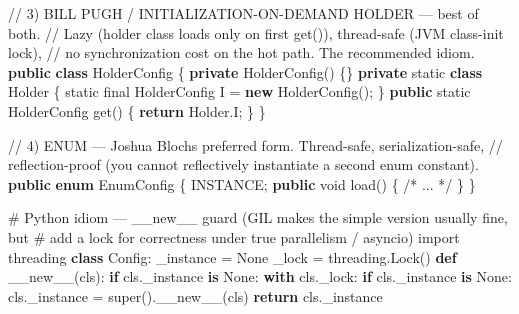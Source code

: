 \documentclass[11pt]{article}
\newenvironment{Shaded}{\begin{snugshade}}{\end{snugshade}}
\newcommand{\BuiltInTok}[1]{\textcolor[rgb]{0.50,0.55,0.55}{#1}}
\newcommand{\CommentTok}[1]{\textcolor[rgb]{0.48,0.49,0.49}{#1}}
\newcommand{\ControlFlowTok}[1]{\textcolor[rgb]{0.99,0.74,0.29}{\textbf{#1}}}
\newcommand{\DataTypeTok}[1]{\textcolor[rgb]{0.16,0.50,0.73}{#1}}
\newcommand{\FunctionTok}[1]{\textcolor[rgb]{0.56,0.27,0.68}{#1}}
\newcommand{\ImportTok}[1]{\textcolor[rgb]{0.15,0.68,0.38}{#1}}
\newcommand{\KeywordTok}[1]{\textcolor[rgb]{0.81,0.81,0.76}{\textbf{#1}}}
\newcommand{\NormalTok}[1]{\textcolor[rgb]{0.81,0.81,0.76}{#1}}
\newcommand{\OperatorTok}[1]{\textcolor[rgb]{0.81,0.81,0.76}{#1}}
\newcommand{\VariableTok}[1]{\textcolor[rgb]{0.15,0.68,0.68}{#1}}
\begin{document}
\begin{Shaded}
\begin{Highlighting}[]
\CommentTok{// 3) BILL PUGH / INITIALIZATION{-}ON{-}DEMAND HOLDER — best of both.}
\CommentTok{//    Lazy (holder class loads only on first get()), thread{-}safe (JVM class{-}init lock),}
\CommentTok{//    no synchronization cost on the hot path. The recommended idiom.}
\KeywordTok{public} \KeywordTok{class}\NormalTok{ HolderConfig }\OperatorTok{\{}
    \KeywordTok{private} \FunctionTok{HolderConfig}\OperatorTok{()} \OperatorTok{\{\}}
    \KeywordTok{private} \DataTypeTok{static} \KeywordTok{class} \BuiltInTok{Holder} \OperatorTok{\{} \DataTypeTok{static} \DataTypeTok{final}\NormalTok{ HolderConfig I }\OperatorTok{=} \KeywordTok{new} \FunctionTok{HolderConfig}\OperatorTok{();} \OperatorTok{\}}
    \KeywordTok{public} \DataTypeTok{static}\NormalTok{ HolderConfig }\FunctionTok{get}\OperatorTok{()} \OperatorTok{\{} \ControlFlowTok{return} \BuiltInTok{Holder}\OperatorTok{.}\FunctionTok{I}\OperatorTok{;} \OperatorTok{\}}
\OperatorTok{\}}

\CommentTok{// 4) ENUM — Joshua Bloch\textquotesingle{}s preferred form. Thread{-}safe, serialization{-}safe,}
\CommentTok{//    reflection{-}proof (you cannot reflectively instantiate a second enum constant).}
\KeywordTok{public} \KeywordTok{enum}\NormalTok{ EnumConfig }\OperatorTok{\{}
\NormalTok{    INSTANCE}\OperatorTok{;}
    \KeywordTok{public} \DataTypeTok{void} \FunctionTok{load}\OperatorTok{()} \OperatorTok{\{} \CommentTok{/* ... */} \OperatorTok{\}}
\OperatorTok{\}}
\end{Highlighting}
\end{Shaded}


\begin{Shaded}
\begin{Highlighting}[]
\CommentTok{\# Python idiom — \_\_new\_\_ guard (GIL makes the simple version usually fine, but}
\CommentTok{\# add a lock for correctness under true parallelism / asyncio)}
\ImportTok{import}\NormalTok{ threading}
\KeywordTok{class}\NormalTok{ Config:}
\NormalTok{    \_instance }\OperatorTok{=} \VariableTok{None}
\NormalTok{    \_lock }\OperatorTok{=}\NormalTok{ threading.Lock()}
    \KeywordTok{def} \FunctionTok{\_\_new\_\_}\NormalTok{(cls):}
        \ControlFlowTok{if}\NormalTok{ cls.\_instance }\KeywordTok{is} \VariableTok{None}\NormalTok{:}
            \ControlFlowTok{with}\NormalTok{ cls.\_lock:}
                \ControlFlowTok{if}\NormalTok{ cls.\_instance }\KeywordTok{is} \VariableTok{None}\NormalTok{:}
\NormalTok{                    cls.\_instance }\OperatorTok{=} \BuiltInTok{super}\NormalTok{().}\FunctionTok{\_\_new\_\_}\NormalTok{(cls)}
        \ControlFlowTok{return}\NormalTok{ cls.\_instance}
\end{Highlighting}
\end{Shaded}
\end{document}
